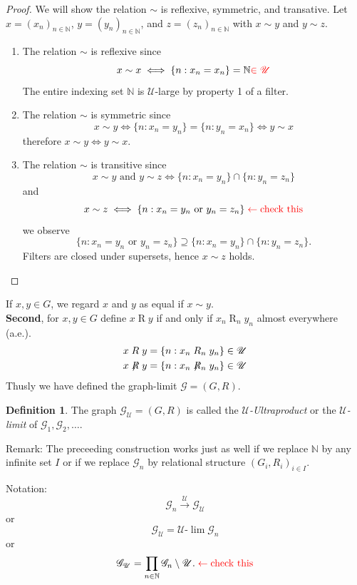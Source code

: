 \documentclass{maatext}
\theoremstyle{definition}
\newtheorem{definition}[theorem]{Definition}
\theoremstyle{remark}
\numberwithin{section}{chapter}
\numberwithin{equation}{chapter}
\begin{document}
\begin{proof}
We will show the relation $\sim$ is reflexive, symmetric, and transative. Let $x = (x_n)_{n \in \mathbb{N}}$, $y = (y_n)_{n \in \mathbb{N}}$, and $z = (z_n)_{n \in \mathbb{N}}$ with $x \sim y$ and $y \sim z$.
\begin{enumerate}
\item The relation $\sim$ is reflexive since 
$$x \sim x \iff \{ n : x_n = x_n\} = \mathbb{N} \color{red}{\in \mathscr{U}}$$
The entire indexing set $\mathbb{N}$ is $\mathscr{U}$-large by property 1 of a filter.
\item The relation $\sim$ is symmetric since
$$x \sim y \iff \{ n : x_n = y_n \} = \{ n : y_n = x_n \} \iff y \sim x$$
therefore $x \sim y \iff y \sim x$.
\item The relation $\sim$ is transitive since
$$x \sim y \text{ and } y \sim z \iff  \{ n : x_n = y_n \} \cap  \{ n : y_n = z_n \}$$
and
$$x \sim z \iff \{ n : x_n = y_n \text{ or } y_n = z_n \}\color{red}\color{red} \leftarrow \text{check this}$$
we observe
$$\{ n : x_n = y_n \text{ or } y_n = z_n \} \supseteq \{ n : x_n = y_n \} \cap  \{ n : y_n = z_n \}.$$
Filters are closed under supersets, hence $x \sim z$ holds. 
\end{enumerate}
\end{proof}

If $x,y\in G$, we regard $x$ and $y$ as equal if $x \sim y$.\\
\textbf{Second}, for $x,y \in G$ define $x \mathrel{R} y$ if and only if $x_n \mathrel{R}_n y_n$ almost everywhere (a.e.).
\begin{align*}
x \mathrel{R} y &= \{ n : x_n \mathrel{R}_n y_n \} \in \mathscr{U}\\
x \not\mathrel{R} y &= \{ n : x_n \not\mathrel{R}_n y_n \} \in \mathscr{U}
\end{align*}
Thusly we have defined the graph-limit $\mathscr{G}=(G,R)$.

\begin{definition}
The graph $\mathscr{G}_\mathscr{U} = (G,R)$ is called the \textit{$\mathscr{U}$-Ultraproduct} or the \textit{$\mathscr{U}$-limit} of $\mathscr{G}_1, \mathscr{G}_2,\dots$. 
\end{definition}

Remark: The preceeding construction works just as well if we replace $\mathbb{N}$ by any infinite set $I$ or if we replace $\mathscr{G}_n$ by relational structure $(G_i, R_i)_{i \in I}$.

Notation:
$$\mathscr{G}_n \overset{\mathscr{U}} \to \mathscr{G}_\mathscr{U}$$
or
$$\mathscr{G}_\mathscr{U} = \mathscr{U}\text{-}\lim\mathscr {G}_n$$
or
$$\mathscr{G}_\mathscr{U} = \prod_{n \in \mathbb{N}} \mathscr{G}_n \setminus \mathscr{U}. \color{red} \leftarrow \text{check this}$$
\end{document}
